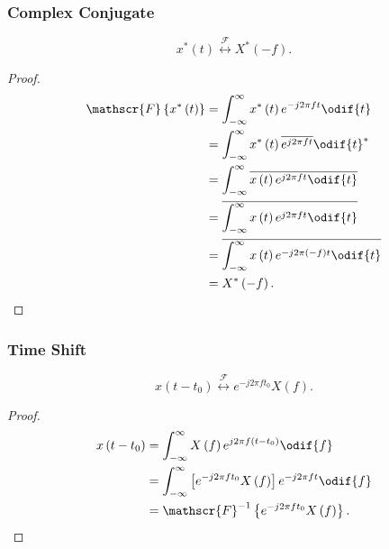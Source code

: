 \documentclass{article}
\begin{document}
\subsubsection{Complex Conjugate}
\begin{equation*}
    x^\ast\left( t \right) \overset{\mathscr{F}}{\longleftrightarrow} X^\ast\left( -f \right).
\end{equation*}
\begin{proof}
    \begin{align*}
        \mathscr{F}\left\{ x^\ast\left( t \right) \right\} & = \int_{-\infty}^\infty x^\ast\left( t \right) e^{-j 2\pi f t} \odif{t}                       \\
                                                           & = \int_{-\infty}^\infty x^\ast\left( t \right) \overline{e^{j 2\pi f t}} \odif{t}^\ast        \\
                                                           & = \int_{-\infty}^\infty \overline{x\left( t \right) e^{j 2\pi f t} \odif{t}}                  \\
                                                           & = \overline{\int_{-\infty}^\infty x\left( t \right) e^{j 2\pi f t} \odif{t}}                  \\
                                                           & = \overline{\int_{-\infty}^\infty x\left( t \right) e^{-j 2\pi \left( -f \right) t} \odif{t}} \\
                                                           & = X^\ast\left( -f \right).
    \end{align*}
\end{proof}
\subsubsection{Time Shift}
\begin{equation*}
    x\left( t - t_0 \right) \overset{\mathscr{F}}{\longleftrightarrow} e^{-j 2\pi f t_0} X\left( f \right).
\end{equation*}
\begin{proof}
    \begin{align*}
        x\left( t - t_0 \right) & = \int_{-\infty}^\infty X\left( f \right) e^{j 2\pi f \left( t - t_0 \right)} \odif{f}              \\
                                & = \int_{-\infty}^\infty \left[ e^{-j 2\pi f t_0} X\left( f \right) \right] e^{-j 2\pi f t} \odif{f} \\
                                & = \mathscr{F}^{-1}\left\{ e^{-j 2\pi f t_0} X\left( f \right) \right\}.
    \end{align*}
\end{proof}
\end{document}
